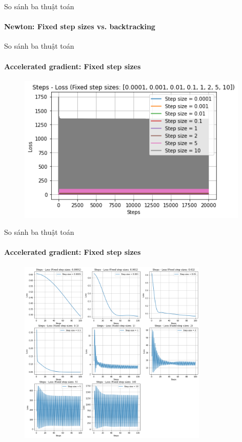 \documentclass[10pt]{beamer}
\theoremstyle{remark}
\theoremstyle{definition}
\begin{document}
\begin{frame}{So sánh ba thuật toán}
	\framesubtitle{Newton: Fixed step sizes vs. backtracking}

\end{frame}

\begin{frame}{So sánh ba thuật toán}
	\framesubtitle{Accelerated gradient: Fixed step sizes}

	\begin{figure}[h!]
		\centering
		\includegraphics[width=11cm]{Thinh/13.png}
	\end{figure}

\end{frame}
\begin{frame}{So sánh ba thuật toán}
	\framesubtitle{Accelerated gradient: Fixed step sizes}

	\begin{figure}[h!]
		\centering
		\includegraphics[width=9cm]{Thinh/14.png}
	\end{figure}

\end{frame}
\end{document}
